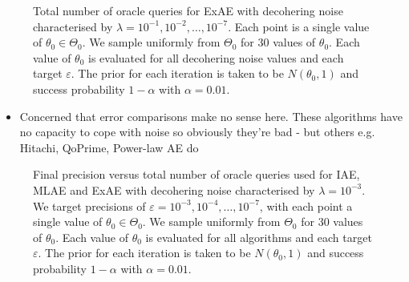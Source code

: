 \begin{figure}[htb]
	\centering
	\caption{Total number of oracle queries for ExAE with decohering noise characterised by $\lambda = 10^{-1}, 10^{-2}, \ldots, 10^{-7}$. Each point is a single value of $\theta_0 \in \Theta_0$. We sample uniformly from $\Theta_0$ for 30 values of $\theta_0$. Each value of $\theta_0$ is evaluated for all decohering noise values and each target $\varepsilon$. The prior for each iteration is taken to be $N(\theta_0, 1)$ and success probability $1 - \alpha$ with $\alpha = 0.01$.}
	\label{fig::query-exae-noisy}
\end{figure}

\begin{itemize}
	\color{red}
	\item Concerned that error comparisons make no sense here. These algorithms have no capacity to cope with noise so obviously they're bad - but others e.g. Hitachi, QoPrime, Power-law AE do
\end{itemize}

\begin{figure}[htb]
	\centering
	\caption{Final precision versus total number of oracle queries used for IAE, MLAE and ExAE with decohering noise characterised by $\lambda = 10^{-3}$. We target precisions of $\varepsilon = 10^{-3}, 10^{-4}, \ldots , 10^{-7}$, with each point a single value of $\theta_0 \in \Theta_0$. We sample uniformly from $\Theta_0$ for 30 values of $\theta_0$. Each value of $\theta_0$ is evaluated for all algorithms and each target $\varepsilon$. The prior for each iteration is taken to be $N(\theta_0, 1)$ and success probability $1 - \alpha$ with $\alpha = 0.01$.}
	\label{fig::query-comparison-noisy}
\end{figure}




